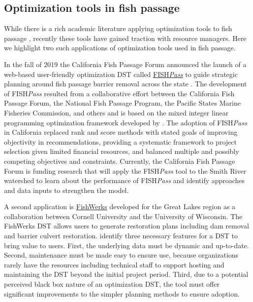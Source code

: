 \documentclass[12pt]{elsarticle}
\begin{document}
\subsection{Optimization tools in fish passage}

While there is a rich academic literature applying optimization tools to fish passage \citep{o2005optimizing, kuby2005multiobjective, mcmanamay2019commonalities, couto2021safeguarding}, recently these tools have gained traction with resource managers. Here we highlight two such applications of optimization tools used in fish passage. 

In the fall of 2019 the California Fish Passage Forum announced the launch of a web-based user-friendly optimization DST called \href{https://fishpass.psmfc.org}{FISH\emph{Pass}} to guide strategic planning around fish passage barrier removal across the state \citep{optipass2015migratory}. The development of FISH\emph{Pass} resulted from a collaborative effort between the California Fish Passage Forum, the National Fish Passage Program, the Pacific States Marine Fisheries Commission, and others and is based on the mixed integer linear programming optimization framework developed by \citet{o2005optimizing}. The adoption of FISH\emph{Pass} in California replaced rank and score methods with stated goals of improving objectivity in recommendations, providing a systematic framework to project selection given limited financial resources, and balanced multiple and possibly competing objectives and constraints. Currently, the California Fish Passage Forum is funding research that will apply the FISH\emph{Pass} tool to the Smith River watershed to learn about the performance of FISH\emph{Pass} and identify approaches and data inputs to strengthen the model.\footnotemark{}


A second application is \href{https://greatlakesconnectivity.org}{FishWerks} developed for the Great Lakes region as a collaboration between Cornell University and the University of Wisconsin. The FishWerks DST allows users to generate restoration plans including dam removal and barrier culvert restoration. \citet{moody2017pet} identify three necessary features for a DST to bring value to users. First, the underlying data must be dynamic and up-to-date. Second, maintenance must be made easy to ensure use, because organizations rarely have the resources including technical staff to support hosting and maintaining the DST beyond the initial project period. Third, due to a potential perceived black box nature of an optimization DST, the tool must offer significant improvements to the simpler planning methods to ensure adoption.
\end{document}
